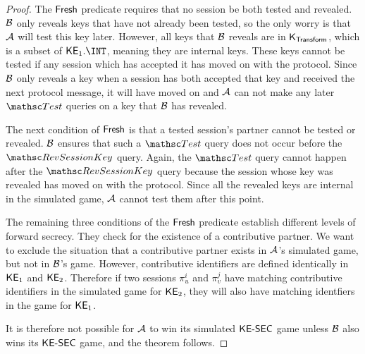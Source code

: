 \begin{proof}
	The $\mathsf{Fresh}$ predicate requires that no session be both tested and revealed.
	$\mathcal{B}$ only reveals keys that have not already been tested, so the only  worry is that $\mathcal{A}$ will test this key later. 
	However, all keys that $\mathcal{B}$ reveals are in $\mathsf{K}_{\mathsf{Transform}}$, which is a subset of $\KE_1.\INT$, meaning they are internal keys.
	These keys cannot be tested if any session which has accepted it has moved on with the protocol.
	Since $\mathcal{B}$ only reveals a key when a session has both accepted that key and received the next protocol message, it will have moved on and $\mathcal{A}$ can not make any later $\Test$ queries on a key that $\mathcal{B}$ has revealed.
	
	The next condition of $\mathsf{Fresh}$ is that a tested session's partner cannot be tested or revealed. 
	$\mathcal{B}$ ensures that such a $\Test$ query does not occur before the $\RevSessionKey$ query. 
	Again, the $\Test$ query cannot happen after the $\RevSessionKey$ query because the session whose key was revealed has moved on with the protocol.
	Since all the revealed keys are internal in the simulated game, $\mathcal{A}$ cannot test them after this point. 
	
	The remaining three conditions of the $\mathsf{Fresh}$ predicate establish different levels of forward secrecy. 
	They check for the existence of a contributive partner.
	We want to exclude the situation that a contributive partner exists in $\mathcal{A}$'s simulated game, but not in $\mathcal{B}$'s game.
	However, contributive identifiers are defined identically in $\mathsf{KE}_1$ and $\mathsf{KE}_2$. 
	Therefore if two sessions $\pi_u^i$ and $\pi_v^j$ have matching contributive identifiers in the simulated game for $\mathsf{KE}_2$, they will also have matching identfiers in the game for $\mathsf{KE}_1$.
	
	It is therefore not possible for $\mathcal{A}$ to win its simulated $\mathsf{KE{\text{\normalfont-}}SEC}$ game unless $\mathcal{B}$ also wins its $\mathsf{KE{\text{\normalfont-}}SEC}$ game, and the theorem follows.
\end{proof}